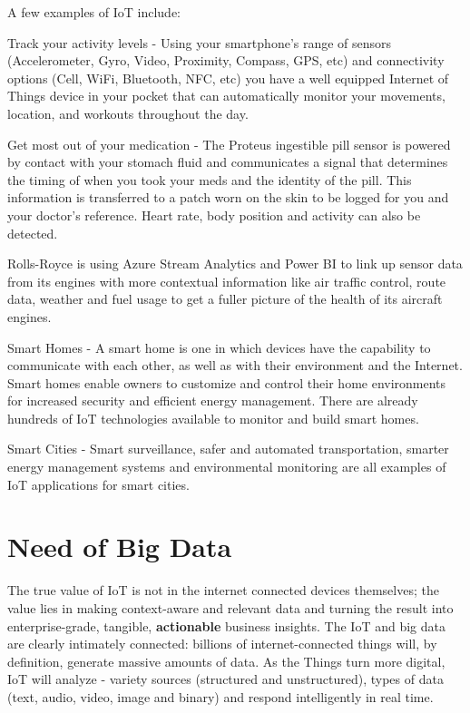 \documentclass[sigconf]{acmart}
\begin{document}
A few examples of IoT include:

Track your activity levels - Using your smartphone's range of sensors (Accelerometer, Gyro, Video, Proximity, Compass, GPS, etc) and connectivity options (Cell, WiFi, Bluetooth, NFC, etc) you have a well equipped Internet of Things device in your pocket that can automatically monitor your movements, location, and workouts throughout the day.

Get most out of your medication - The Proteus ingestible pill sensor is powered by contact with your stomach fluid and communicates a signal that determines the timing of when you took your meds and the identity of the pill. This information is transferred to a patch worn on the skin to be logged for you and your doctor's reference. Heart rate, body position and activity can also be detected.

Rolls-Royce is using Azure Stream Analytics and Power BI to link up sensor data from its engines with more contextual information like air traffic control, route data, weather and fuel usage to get a fuller picture of the health of its aircraft engines.

Smart Homes - A smart home is one in which devices have the capability to communicate with each other, as well as with their environment and the Internet. Smart homes enable owners to customize and control their home environments for increased security and efficient energy management. There are already hundreds of IoT technologies available to monitor and build smart homes.

Smart Cities - Smart surveillance, safer and automated transportation, smarter energy management systems and environmental monitoring are all examples of IoT applications for smart cities.

\section{Need of Big Data}

The true value of IoT is not in the internet connected devices themselves; the value lies in making context-aware and relevant data and turning the result into enterprise-grade, tangible, \textbf{actionable} business insights. The IoT and big data are clearly intimately connected: billions of internet-connected things will, by definition, generate massive amounts of data. As the Things turn more digital, IoT will analyze - variety sources (structured and unstructured), types of data (text, audio, video, image and binary) and respond intelligently in real time. 
\end{document}
